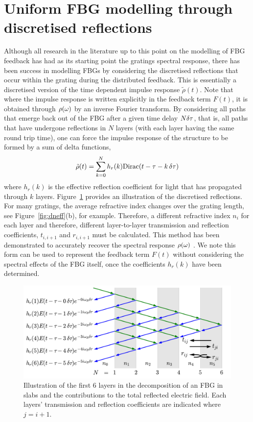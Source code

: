 \section{Uniform FBG modelling through discretised reflections}
\label{sec:FBG_discretised}
%
%
Although all research in the literature up to this point on the modelling of FBG feedback has had as its starting point the gratings spectral response, there has been success in modelling FBGs by considering the discretised reflections that occur within the grating during the distributed feedback. This is essentially a discretised version of the time dependent impulse response $\tilde{\rho}(t)$. Note that where the impulse response is written explicitly in the feedback term $F(t)$, it is obtained through $\rho(\omega)$ by an inverse Fourier transform. By considering all paths that emerge back out of the FBG after a given time delay $N \delta \tau$, that is, all paths that have undergone reflections in $N$ layers (with each layer having the same round trip time), one can force the impulse response of the structure to be formed by a sum of delta functions,
%
\begin{equation}
    \tilde{\rho}(t) = \sum_{k=0}^N h_r(k) \text{Dirac}(t-\tau-k\, \delta \tau)
\end{equation}
%
where $h_r(k)$ is the effective reflection coefficient for light that has propagated through $k$ layers. Figure~\ref{fig:Slab_like_FBG_discretised} provides an illustration of the discretised reflections. For many gratings, the average refractive index changes over the grating length, see Figure~\ref{fig:dneff}(b), for example. Therefore, a different refractive index $n_i$ for each layer and therefore, different layer-to-layer transmission and reflection coefficients, $t_{i,i+1}$ and $r_{i,i+1}$ must be calculated. This method has been demonstrated to accurately recover the spectral response $\rho(\omega)$ \cite{capmany2007synthesis}. We note this form can be used to represent the feedback term $F(t)$ without considering the spectral effects of the FBG itself, once the coefficients $h_r(k)$ have been determined.
%
\begin{figure}[!t]
    \centering
    
    \includegraphics[width=0.8\linewidth]{Images/Chapter 2/discretised reflections.pdf}
    
    \caption{Illustration of the first 6 layers in the decomposition of an FBG in slabs and the contributions to the total reflected electric field. Each layers' transmission and reflection coefficients are indicated where $j = i+1$.}
    
    \label{fig:Slab_like_FBG_discretised}
\end{figure}

